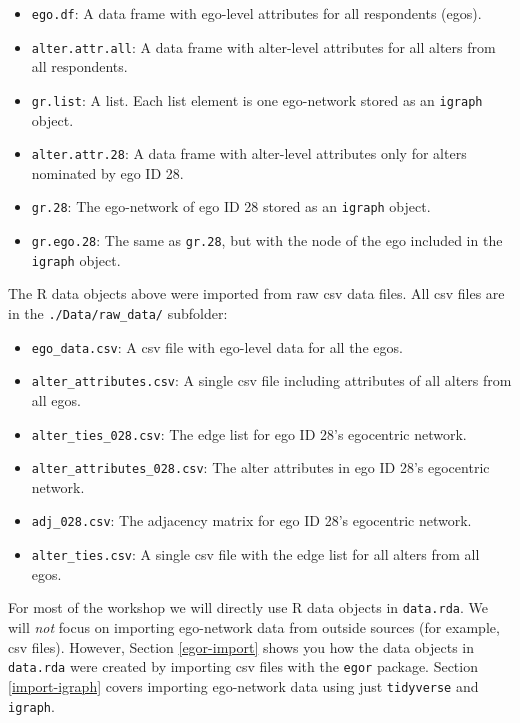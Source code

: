\documentclass[
]{book}
\providecommand{\tightlist}{%
  \setlength{\itemsep}{0pt}\setlength{\parskip}{0pt}}
\begin{document}
\begin{itemize}
\tightlist
\item
  \texttt{ego.df}: A data frame with ego-level attributes for all respondents (egos).
\item
  \texttt{alter.attr.all}: A data frame with alter-level attributes for all alters from all respondents.
\item
  \texttt{gr.list}: A list. Each list element is one ego-network stored as an \texttt{igraph} object.
\item
  \texttt{alter.attr.28}: A data frame with alter-level attributes only for alters nominated by ego ID 28.
\item
  \texttt{gr.28}: The ego-network of ego ID 28 stored as an \texttt{igraph} object.
\item
  \texttt{gr.ego.28}: The same as \texttt{gr.28}, but with the node of the ego included in the \texttt{igraph} object.
\end{itemize}

The R data objects above were imported from raw csv data files. All csv files are in the \texttt{./Data/raw\_data/} subfolder:

\begin{itemize}
\tightlist
\item
  \texttt{ego\_data.csv}: A csv file with ego-level data for all the egos.
\item
  \texttt{alter\_attributes.csv}: A single csv file including attributes of all alters from all egos.
\item
  \texttt{alter\_ties\_028.csv}: The edge list for ego ID 28's egocentric network.
\item
  \texttt{alter\_attributes\_028.csv}: The alter attributes in ego ID 28's egocentric network.
\item
  \texttt{adj\_028.csv}: The adjacency matrix for ego ID 28's egocentric network.
\item
  \texttt{alter\_ties.csv}: A single csv file with the edge list for all alters from all egos.
\end{itemize}

For most of the workshop we will directly use R data objects in \texttt{data.rda}. We will \emph{not} focus on importing ego-network data from outside sources (for example, csv files). However, Section \ref{egor-import} shows you how the data objects in \texttt{data.rda} were created by importing csv files with the \texttt{egor} package. Section \ref{import-igraph} covers importing ego-network data using just \texttt{tidyverse} and \texttt{igraph}.
\end{document}
